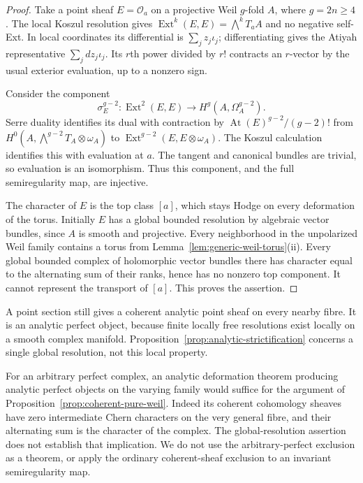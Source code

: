 \documentclass[11pt]{article}
\theoremstyle{definition}
\theoremstyle{remark}
\begin{document}
\begin{proof}
Take a point sheaf $E=\mathcal O_a$ on a projective Weil
$g$-fold $A$, where $g=2n\ge4$.  The local Koszul resolution
gives $\operatorname{Ext}^k(E,E)=\bigwedge^kT_aA$ and no
negative self-Ext.  In local coordinates its differential is
$\sum_j z_j\iota_j$; differentiating gives the Atiyah
representative $\sum_j dz_j\iota_j$.  Its $r$th power divided
by $r!$ contracts an $r$-vector by the usual exterior evaluation,
up to a nonzero sign.

Consider the component
\[
 \sigma_E^{g-2}:\operatorname{Ext}^2(E,E)
       \longrightarrow H^g(A,\Omega_A^{g-2}).
\]
Serre duality identifies its dual with contraction by
$\operatorname{At}(E)^{g-2}/(g-2)!$ from
$H^0(A,\bigwedge^{g-2}T_A\otimes\omega_A)$ to
$\operatorname{Ext}^{g-2}(E,E\otimes\omega_A)$.
The Koszul calculation identifies this with evaluation at $a$.
The tangent and canonical bundles are trivial, so evaluation
is an isomorphism.  Thus this component, and the full
semiregularity map, are injective.

The character of $E$ is the top class $[a]$, which stays Hodge
on every deformation of the torus.  Initially $E$ has a global
bounded resolution by algebraic vector bundles, since $A$ is
smooth and projective.  Every neighborhood in the unpolarized
Weil family contains a torus from
Lemma~\ref{lem:generic-weil-torus}(ii).  Every global bounded
complex of holomorphic vector bundles there has character
equal to the alternating sum of their ranks, hence has no
nonzero top component.  It cannot represent the transport of
$[a]$.  This proves the assertion.
\end{proof}

A point section still gives a coherent analytic point sheaf on
every nearby fibre.  It is an analytic perfect object, because
finite locally free resolutions exist locally on a smooth
complex manifold.  Proposition~\ref{prop:analytic-strictification}
concerns a single global resolution, not this local property.

For an arbitrary perfect complex, an analytic deformation theorem
producing analytic perfect objects on the varying family would
suffice for the argument of
Proposition~\ref{prop:coherent-pure-weil}.  Indeed its coherent
cohomology sheaves have zero intermediate Chern characters on
the very general fibre, and their alternating sum is the
character of the complex.  The global-resolution assertion
does not establish that implication.  We do not use the
arbitrary-perfect exclusion as a theorem, or apply the ordinary
coherent-sheaf exclusion to an invariant semiregularity map.
\end{document}
